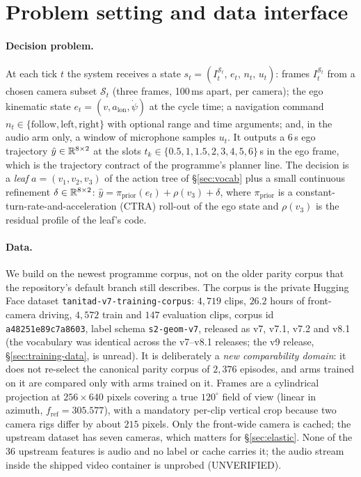 \section{Problem setting and data interface}\label{sec:prelim-setting}\label{sec:problem}
\paragraph{Decision problem.}
At each tick $t$ the system receives a state $s_t=(I_t^{\mathcal S_t},\,e_t,\,n_t,\,u_t)$: frames $I_t^{\mathcal S_t}$ from a chosen
camera subset $\mathcal S_t$ (three frames, 100\,ms apart, per camera); the ego kinematic state $e_t=(v,a_{\text{lon}},\dot\psi)$ at the
cycle time; a navigation command $n_t\in\{\text{follow},\text{left},\text{right}\}$ with optional range and time arguments; and, in the audio arm only,
a window of microphone samples $u_t$. It outputs a 6\,s ego trajectory $\hat y\in\mathbb R^{8\times2}$ at the slots
$t_k\in\{0.5,1,1.5,2,3,4,5,6\}$\,s in the ego frame, which is the trajectory contract of the programme's planner line.
The decision is a \emph{leaf} $a=(v_1,v_2,v_3)$ of the action tree of \S\ref{sec:vocab} plus a small continuous refinement $\delta\in\mathbb R^{8\times 2}$:
$\hat y=\pi_{\text{prior}}(e_t)+\rho(v_3)+\delta$, where $\pi_{\text{prior}}$ is a constant-turn-rate-and-acceleration (CTRA) roll-out of the ego state and
$\rho(v_3)$ is the residual profile of the leaf's code.

\paragraph{Data.}
We build on the newest programme corpus, not on the older parity corpus that the repository's default branch still describes.
The corpus is the private Hugging Face dataset \texttt{tanitad-v7-training-corpus}: $4{,}719$ clips, $26.2$ hours of front-camera driving,
$4{,}572$ train and $147$ evaluation clips, corpus id \texttt{a48251e89c7a8603}, label schema \texttt{s2-geom-v7}, released as v7, v7.1, v7.2 and v8.1
(the vocabulary was identical across the v7--v8.1 releases; the v9 release, \S\ref{sec:training-data}, is unread)\evI. It is deliberately a \emph{new comparability domain}: it does not re-select
the canonical parity corpus of $2{,}376$ episodes, and arms trained on it are compared only with arms trained on it. Frames are a cylindrical
projection at $256\times640$ pixels covering a true $120^\circ$ field of view (linear in azimuth, $f_{\text{ref}}=305.577$), with a mandatory
per-clip vertical crop because two camera rigs differ by about $215$ pixels. Only the front-wide camera is cached; the upstream dataset has seven
cameras, which matters for \S\ref{sec:elastic}. None of the 36 upstream features is audio and no label or cache carries it; the audio stream inside the shipped video container is unprobed (UNVERIFIED).

